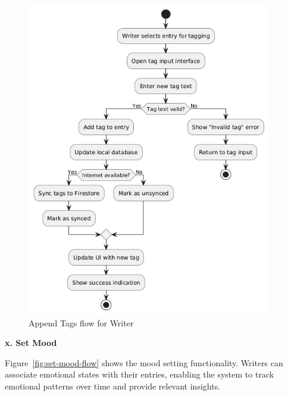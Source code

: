 \begin{figure}[H]
\centering
\includegraphics[width=0.95\textwidth,height=0.7\textheight,keepaspectratio]{files/imgs/append_tags_flow.png}
\caption{Append Tags flow for Writer}
\label{fig:append-tags-flow}
\end{figure}
\clearpage

\textbf{x. Set Mood}

Figure~\ref{fig:set-mood-flow} shows the mood setting functionality. Writers can associate emotional states with their entries, enabling the system to track emotional patterns over time and provide relevant insights.

